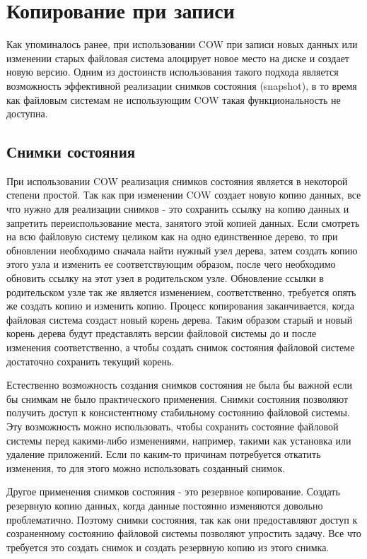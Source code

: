 \section{Копирование при записи}

Как упоминалось ранее, при использовании COW при записи новых данных или
изменении старых файловая система алоцирует новое место на диске и создает
новую версию. Одним из достоинств использования такого подхода является
возможность эффективной реализации снимков состояния (snapshot), в то время как
файловым системам не использующим COW такая функциональность не доступна.

\subsection{Снимки состояния}

При использовании COW реализация снимков состояния является в некоторой степени
простой. Так как при изменении COW создает новую копию данных, все что нужно для
реализации снимков - это сохранить ссылку на копию данных и запретить
переиспользование места, занятого этой копией данных. Если смотреть на всю
файловую систему целиком как на одно единственное дерево, то при обновлении
необходимо сначала найти нужный узел дерева, затем создать копию этого узла и
изменить ее соответствующим образом, после чего необходимо обновить ссылку на
этот узел в родительском узле. Обновление ссылки в родительском узле так же
является изменением, соответственно, требуется опять же создать копию и изменить
копию. Процесс копирования заканчивается, когда файловая система создаст новый
корень дерева. Таким образом старый и новый корень дерева будут представлять
версии файловой системы до и после изменения соответственно, а чтобы создать
снимок состояния файловой системе достаточно сохранить текущий корень.

Естественно возможность создания снимков состояния не была бы важной если бы
снимкам не было практического применения. Снимки состояния позволяют получить
доступ к консистентному стабильному состоянию файловой системы. Эту возможность
можно использовать, чтобы сохранить состояние файловой системы перед какими-либо
изменениями, например, такими как установка или удаление приложений. Если по
каким-то причинам потребуется откатить изменения, то для этого можно
использовать созданный снимок.

Другое применения снимков состояния - это резервное копирование. Создать
резервную копию данных, когда данные постоянно изменяются довольно
проблематично. Поэтому снимки состояния, так как они предоставляют доступ к
созраненному состоянию файловой системы позволяют упростить задачу. Все что
требуется это создать снимок и создать резервную копию из этого снимка.

